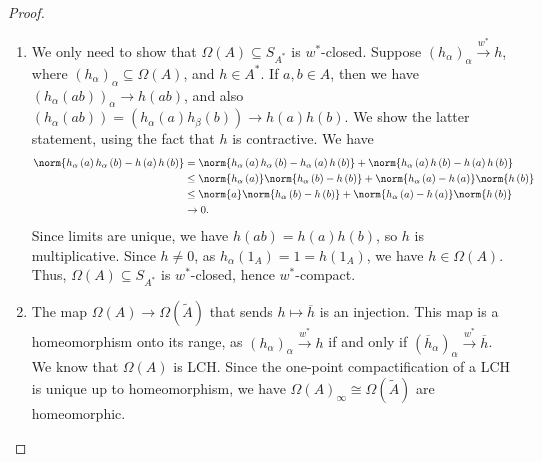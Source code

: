 \documentclass[10pt]{mypackage}
\begin{document}
\begin{proof}\hfill
  \begin{enumerate}[(1)]
    \item We only need to show that $\Omega\left(A\right)\subseteq S_{A^{\ast}}$ is $w^{\ast}$-closed. Suppose $\left(h_{\alpha}\right)_{\alpha}\xrightarrow{w^{\ast}}h$, where $\left(h_{\alpha}\right)_{\alpha}\subseteq \Omega\left(A\right)$, and $h\in A^{\ast}$. If $a,b\in A$, then we have $\left(h_{\alpha}\left(ab\right)\right)_{\alpha}\rightarrow h\left(ab\right)$, and also $\left(h_{\alpha}\left(ab\right)\right) = \left(h_{\alpha}\left(a\right)h_{\beta}\left(b\right)\right) \rightarrow h\left(a\right)h\left(b\right)$. We show the latter statement, using the fact that $h$ is contractive. We have
      \begin{align*}
        \norm{h_{\alpha}\left(a\right)h_{\alpha}\left(b\right) - h\left(a\right)h\left(b\right)} &= \norm{h_{\alpha}\left(a\right)h_{\alpha}\left(b\right) - h_{\alpha}\left(a\right)h\left(b\right)} + \norm{h_{\alpha}\left(a\right)h\left(b\right) - h\left(a\right)h\left(b\right)}\\
                                                   &\leq \norm{h_{\alpha}\left(a\right)}\norm{h_{\alpha}\left(b\right)-h\left(b\right)} + \norm{h_{\alpha}\left(a\right)-h\left(a\right)}\norm{h\left(b\right)}\\
                                                       &\leq \norm{a}\norm{h_{\alpha}\left(b\right)-h\left(b\right)} + \norm{h_{\alpha}\left(a\right) - h\left(a\right)}\norm{h\left(b\right)}\\
                                                       &\rightarrow 0.
      \end{align*}
      Since limits are unique, we have $h\left(ab\right) = h\left(a\right)h\left(b\right)$, so $h$ is multiplicative. Since $h\neq 0$, as $h_{\alpha}\left(1_A\right) = 1 = h\left(1_A\right)$, we have $h\in \Omega\left(A\right)$. Thus, $\Omega\left(A\right)\subseteq S_{A^{\ast}}$ is $w^{\ast}$-closed, hence $w^{\ast}$-compact.
    \item The map $\Omega\left(A\right)\rightarrow \Omega\left(\widetilde{A}\right)$ that sends $h\mapsto \overline{h}$ is an injection. This map is a homeomorphism onto its range, as $\left(h_{\alpha}\right)_{\alpha}\xrightarrow{w^{\ast}}h$ if and only if $\left(\overline{h}_{\alpha}\right)_{\alpha}\xrightarrow{w^{\ast}} \overline{h}$. We know that $\Omega\left(A\right)$ is LCH. Since the one-point compactification of a LCH is unique up to homeomorphism, we have $\Omega\left(A\right)_{\infty}\cong \Omega\left(\widetilde{A}\right)$ are homeomorphic.
    \end{enumerate}
\end{proof}
\end{document}
